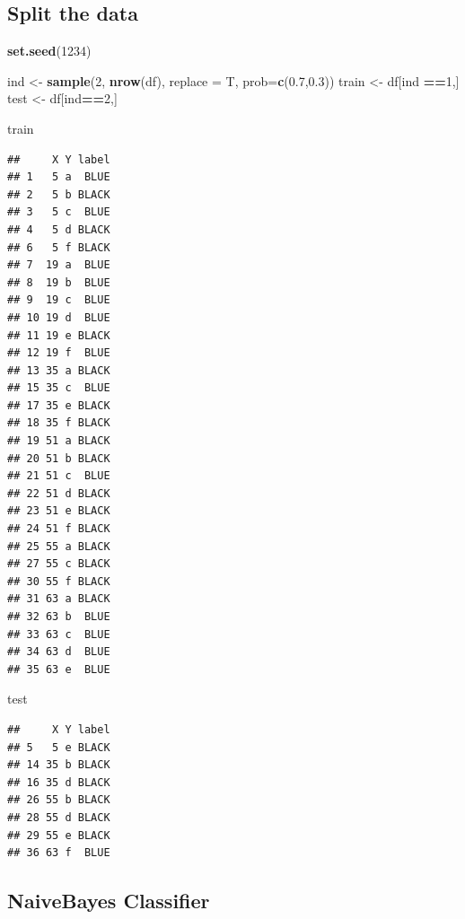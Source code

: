 \documentclass[
]{article}
\newenvironment{Shaded}{\begin{snugshade}}{\end{snugshade}}
\newcommand{\DataTypeTok}[1]{\textcolor[rgb]{0.13,0.29,0.53}{#1}}
\newcommand{\DecValTok}[1]{\textcolor[rgb]{0.00,0.00,0.81}{#1}}
\newcommand{\FloatTok}[1]{\textcolor[rgb]{0.00,0.00,0.81}{#1}}
\newcommand{\KeywordTok}[1]{\textcolor[rgb]{0.13,0.29,0.53}{\textbf{#1}}}
\newcommand{\NormalTok}[1]{#1}
\newcommand{\OperatorTok}[1]{\textcolor[rgb]{0.81,0.36,0.00}{\textbf{#1}}}
\newcommand{\StringTok}[1]{\textcolor[rgb]{0.31,0.60,0.02}{#1}}
\begin{document}
\hypertarget{split-the-data}{%
\subsection{\texorpdfstring{\textbf{Split the
data}}{Split the data}}\label{split-the-data}}

\begin{Shaded}
\begin{Highlighting}[]
\KeywordTok{set.seed}\NormalTok{(}\DecValTok{1234}\NormalTok{)}

\NormalTok{ind <-}\StringTok{ }\KeywordTok{sample}\NormalTok{(}\DecValTok{2}\NormalTok{, }\KeywordTok{nrow}\NormalTok{(df), }\DataTypeTok{replace =}\NormalTok{ T, }\DataTypeTok{prob=}\KeywordTok{c}\NormalTok{(}\FloatTok{0.7}\NormalTok{,}\FloatTok{0.3}\NormalTok{))}
\NormalTok{train <-}\StringTok{ }\NormalTok{df[ind }\OperatorTok{==}\DecValTok{1}\NormalTok{,]}
\NormalTok{test <-}\StringTok{ }\NormalTok{df[ind}\OperatorTok{==}\DecValTok{2}\NormalTok{,]}

\NormalTok{train}
\end{Highlighting}
\end{Shaded}

\begin{verbatim}
##     X Y label
## 1   5 a  BLUE
## 2   5 b BLACK
## 3   5 c  BLUE
## 4   5 d BLACK
## 6   5 f BLACK
## 7  19 a  BLUE
## 8  19 b  BLUE
## 9  19 c  BLUE
## 10 19 d  BLUE
## 11 19 e BLACK
## 12 19 f  BLUE
## 13 35 a BLACK
## 15 35 c  BLUE
## 17 35 e BLACK
## 18 35 f BLACK
## 19 51 a BLACK
## 20 51 b BLACK
## 21 51 c  BLUE
## 22 51 d BLACK
## 23 51 e BLACK
## 24 51 f BLACK
## 25 55 a BLACK
## 27 55 c BLACK
## 30 55 f BLACK
## 31 63 a BLACK
## 32 63 b  BLUE
## 33 63 c  BLUE
## 34 63 d  BLUE
## 35 63 e  BLUE
\end{verbatim}

\begin{Shaded}
\begin{Highlighting}[]
\NormalTok{test}
\end{Highlighting}
\end{Shaded}

\begin{verbatim}
##     X Y label
## 5   5 e BLACK
## 14 35 b BLACK
## 16 35 d BLACK
## 26 55 b BLACK
## 28 55 d BLACK
## 29 55 e BLACK
## 36 63 f  BLUE
\end{verbatim}

\hypertarget{naivebayes-classifier}{%
\subsection{\texorpdfstring{\textbf{NaiveBayes
Classifier}}{NaiveBayes Classifier}}\label{naivebayes-classifier}}
\end{document}

